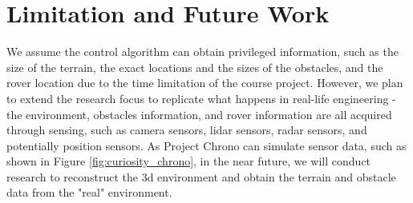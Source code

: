 \documentclass{article}
\begin{document}
\section{Limitation and Future Work}

We assume the control algorithm can obtain privileged information, such as the size of the terrain, the exact locations and the sizes of the obstacles, and the rover location due to the time limitation of the course project. However, we plan to extend the research focus to replicate what happens in real-life engineering - the environment, obstacles information, and rover information are all acquired through sensing, such as camera sensors, lidar sensors, radar sensors, and potentially position sensors. As Project Chrono can simulate sensor data, such as shown in Figure \ref{fig:curiosity_chrono}, in the near future, we will conduct research to reconstruct the 3d environment and obtain the terrain and obstacle data from the "real" environment. 



\end{document}
